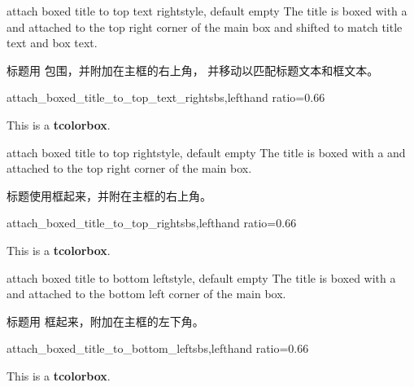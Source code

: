 \begin{docTcbKey}[][doc new=2021-07-30]{attach boxed title to top text right}{}{style, default empty}
The title is boxed with a  and attached to
the top right corner of the main box
and shifted to match title text and box text.

标题用  包围，并附加在主框的右上角， 并移动以匹配标题文本和框文本。
\begin{exdispExample*}{attach_boxed_title_to_top_text_right}{sbs,lefthand ratio=0.66}
\begin{tcolorbox}[enhanced,title=My title,
  halign=right,
  attach boxed title to top text right]
  This is a \textbf{tcolorbox}.
\end{tcolorbox}
\end{exdispExample*}
\end{docTcbKey}


\begin{docTcbKey}{attach boxed title to top right}{}{style, default empty}
The title is boxed with a  and attached to
the top right corner of the main box.

标题使用框起来，并附在主框的右上角。
\begin{exdispExample*}{attach_boxed_title_to_top_right}{sbs,lefthand ratio=0.66}
\begin{tcolorbox}[enhanced,title=My title,
  attach boxed title to top right]
  This is a \textbf{tcolorbox}.
\end{tcolorbox}
\end{exdispExample*}
\end{docTcbKey}


\begin{docTcbKey}{attach boxed title to bottom left}{}{style, default empty}
The title is boxed with a  and attached to
the bottom left corner of the main box.

标题用  框起来，附加在主框的左下角。
\begin{exdispExample*}{attach_boxed_title_to_bottom_left}{sbs,lefthand ratio=0.66}
\begin{tcolorbox}[enhanced,title=My title,
  attach boxed title to bottom left]
  This is a \textbf{tcolorbox}.
\end{tcolorbox}
\end{exdispExample*}
\end{docTcbKey}


